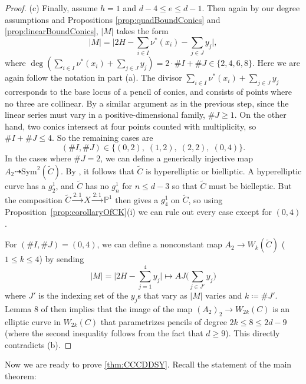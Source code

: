 \documentclass[fontsize=11pt,reqno]{amsart}
\theoremstyle{definition}
\theoremstyle{remark}
\newcommand{\tC}{\widetilde{C}}
\renewcommand{\P}{\mathbb{P}}
\begin{document}
\begin{proof}
(c) Finally, assume $h=1$ and $d-4 \leq e \leq d-1$. Then again by our degree assumptions and Propositions \ref{prop:quadBoundConics} and \ref{prop:linearBoundConics}, $|M|$ takes the form
\[ |M| = \Big| 2H - \sum_{i \in I} \nu^{\ast}(x_{i}) - \sum_{j \in J} y_{j} \Big|, \]
where $\deg (\sum_{i \in I} \nu^{\ast}(x_{i}) + \sum_{j \in J} y_{j}) = 2\cdot \#I + \#J \in \{ 2, 4, 6, 8 \}$. Here we are again follow the notation in part (a). The divisor $\sum_{i \in I} \nu^{\ast}(x_{i}) + \sum_{j \in J} y_{j}$ corresponds to the base locus of a pencil of conics, and consists of points where no three are collinear. By a similar argument as in the previous step, since the linear series must vary in a positive-dimensional family, $\#J\geq 1$. On the other hand, two conics intersect at four points counted with multiplicity, so $\#I + \#J\leq 4$. So the remaining cases are
    \[ (\#I, \#J) \in \{(0, 2),\;(1, 2),\;(2, 2),\;(0, 4)\}. \]
In the cases where $\#J=2$, we can define a generically injective map $A_2 \dashrightarrow \text{Sym}^2(\tC)$. By \cite[Theorem 2(a)]{HS1991}, it follows that $\tC$ is hyperelliptic or bielliptic. A hyperelliptic curve has a $g^1_2$, and $\tC$ has no $g^1_n$ for $n\leq d-3$ so that $\tC$ must be bielleptic. But the composition $\tC \stackrel{2:1}{\longrightarrow} X \stackrel{2:1}{\longrightarrow} \P^1$ then gives a $g^1_4$ on $\tC$, so using Proposition~\ref{prop:corollaryOfCK}(i) we can rule out every case except for $(0,4)$.
    
For $(\#I, \#J) = (0,4)$, we can define a nonconstant map $A_2 \to W_k(\tC)$ ($1 \leq k\leq 4$) by sending
    \[ |M|=\Big|2H-\sum_{j=1}^4 y_j\Big| \longmapsto AJ \Big( \sum_{j \in J'} y_j \Big)\]
where $J'$ is the indexing set of the $y_j$s that vary as $|M|$ varies and $k \coloneqq \# J'$. Lemma 8 of \cite{Abramovich91} then implies that the image of the map $(A_2)_2 \rightarrow W_{2k}(C)$ is an elliptic curve in $W_{2k}(C)$ that parametrizes pencils of degree $2k \leq 8 \leq 2d-9$ (where the second inequality follows from the fact that $d \geq 9$). This directly contradicts (b). \qedhere

\end{proof}
Now we are ready to prove \cref{thm:CCCDDSY}. Recall the statement of the main theorem:
\end{document}
